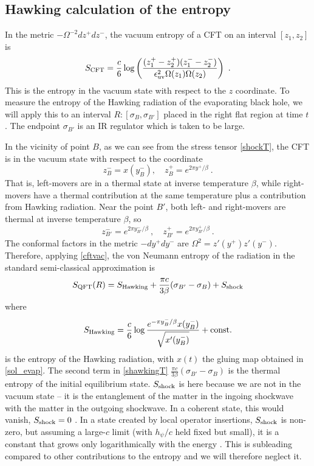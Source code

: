 \documentclass[12pt]{article}
\newcommand{\be}{\begin{equation}}
\newcommand{\ee}{\end{equation}}
\def\be{\begin{eqnarray}}
\def\ee{\end{eqnarray}}
\def\be{\begin{equation}}
\def\ee{\end{equation}}
\numberwithin{equation}{section}
\def\be{\begin{equation}}
\def\ee{\end{equation}}
\def \be {\begin{equation}}
\def \ee {\end{equation}}
\newcommand{\Smatter}{S_{\rm QFT}}
\begin{document}
\begin{spacing}{1.1}
 \newcommand{\epsilonuv}{\epsilon_{\rm uv}}
\subsection{Hawking calculation of the entropy}
In the metric $-\Omega^{-2}dz^+ dz^-$, the vacuum entropy of a CFT on an interval $[z_1, z_2]$ is
\be\label{cftvac}
S_{\rm CFT} =  \frac{c}{6}\log \left( \frac{(z_1^+ - z_2^+)(z_1^- - z_2^-) }{\epsilonuv^2 \Omega(z_1)\Omega(z_2)} \right) \ .
\ee
This is the entropy in the vacuum state with respect to the $z$ coordinate. 
To measure the entropy of the Hawking radiation of the evaporating black hole, we will apply this to an interval $R: [\sigma_B, \sigma_{B'}]$ placed in the right flat region at time $t$. The endpoint $\sigma_{B'}$ is an IR regulator which is taken to be large.

In the vicinity of point $B$, as we can see from the stress tensor \eqref{shockT}, the CFT is in the vacuum state with respect to the coordinate
\be
z_B^- = x(y^-_B) , \quad z_B^+ = e^{2\pi y^+/\beta} \ .
\ee
That is, left-movers are in a thermal state at inverse temperature $\beta$, while right-movers have a thermal contribution at the same temperature plus a contribution from Hawking radiation. Near the point $B'$, both left- and right-movers are thermal at inverse temperature $\beta$, so
\be
z_{B'}^- = e^{2\pi y_{B'}^-/\beta} \ , \quad z_{B'}^+ = e^{2\pi y_{B'}^+/\beta} \ .
\ee
The conformal factors in the metric $-dy^+ dy^-$ are $\Omega^2 = z'%
(y^+)z'%
(y^-)$.
Therefore, applying \eqref{cftvac}, the von Neumann entropy of the radiation in the standard semi-classical approximation is
\be\label{shawkingT}
\Smatter(R) = S_{\rm Hawking}+ \frac{\pi c}{3\beta}(\sigma_{B'} - \sigma_B) + S_{\rm shock} 
\ee
where
\be\label{shawkingB}
S_{\rm Hawking} = \frac{c}{6} \log \frac{e^{-\pi y_B^-/\beta}x(y^-_B)}{\sqrt{x'(y^-_B)}}  + \mbox{const.}
\ee
is the entropy of the Hawking radiation, with $x(t)$ the gluing map obtained in \eqref{sol_evap}. The second term in \eqref{shawkingT} $\frac{\pi c}{3\beta}(\sigma_{B'} - \sigma_B)$ is the thermal entropy of the initial equilibrium state. $S_{\rm shock}$ is here because we are not in the vacuum state -- it is the entanglement of the matter in the ingoing shockwave with the matter in the outgoing shockwave. In a coherent state, this would vanish, $S_{\rm shock}=0$ \cite{Fiola:1994ir}. In a state created by local operator insertions, $S_{\rm shock}$ is non-zero, but assuming a large-$c$ limit (with $h_\psi/c$ held fixed but small), it is a constant that grows only logarithmically with the energy \cite{Asplund:2014coa,Caputa:2015waa}. This is subleading compared to other contributions to the entropy and we will therefore neglect it. 



\end{spacing}
\end{document}
